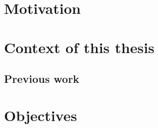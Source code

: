 \section{Motivation}
\section{Context of this thesis}
\subsection{Previous work}

\section{Objectives}

